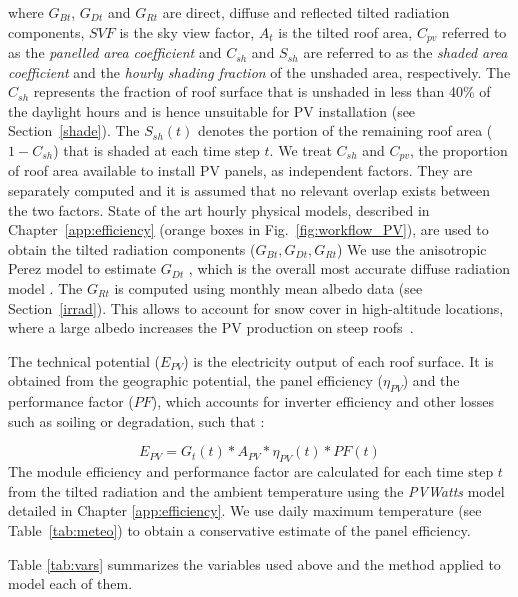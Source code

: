 where $G_{Bt}$, $G_{Dt}$ and $G_{Rt}$ are direct, diffuse and reflected tilted radiation components, $\mathit{SVF}$ is the sky view factor, $A_{t}$ is the tilted roof area, $C_{\mathit{pv}}$ referred to as the \textit{panelled area coefficient} and $C_{sh}$ and $S_{sh}$ are referred to as the \textit{shaded area coefficient} and the \textit{hourly shading fraction} of the unshaded area, respectively.
%
The $C_{sh}$ represents the fraction of roof surface that is unshaded in less than 40\% of the daylight hours and is hence unsuitable for PV installation (see Section~\ref{shade}). The $S_{sh}(t)$ denotes the portion of the remaining roof area ($1 - C_{sh}$) that is shaded at each time step $t$. 
We treat $C_{sh}$ and $C_{\mathit{pv}}$, the proportion of roof area available to install PV panels, as independent factors. They are separately computed and it is assumed that no relevant overlap exists between the two factors. 
%
State of the art hourly physical models, described in Chapter~\ref{app:efficiency} (orange boxes in Fig.~\ref{fig:workflow_PV}), are used to obtain the tilted radiation components ($G_{Bt}, G_{Dt}, G_{Rt}$) 
We use the anisotropic Perez model \cite{perez_modeling_1990} to estimate $G_{Dt}$ , which is the overall most accurate diffuse radiation model \cite{noorian_evaluation_2008, loutzenhiser_empirical_2007}. 
The $G_{Rt}$ is computed using monthly mean albedo data (see Section~\ref{irrad}). This allows to account for snow cover in high-altitude locations, where a large albedo increases the PV production on steep roofs~\cite{kahl_bright_2019}.

The technical potential ($E_{PV}$) is the electricity output of each roof surface. It is obtained from the geographic potential, the panel efficiency ($\eta_{PV}$) and the performance factor ($\mathit{PF}$), which accounts for inverter efficiency and other losses such as soiling or degradation, such that \cite{assouline_large-scale_2018}:

\begin{equation}
\label{eq:pv}
E_{PV} = G_t(t) * A_{PV} * \eta_{PV}(t) * \mathit{PF}(t)
\end{equation}
The module efficiency and performance factor are calculated for each time step $t$ from the tilted radiation and the ambient temperature using the \textit{PVWatts} model~\cite{dobos_pvwatts_2014} detailed in Chapter \ref{app:efficiency}. We use daily maximum temperature (see Table~\ref{tab:meteo}) to obtain a conservative estimate of the panel efficiency. 

Table \ref{tab:vars} summarizes the variables used above and the method applied to model each of them. 

